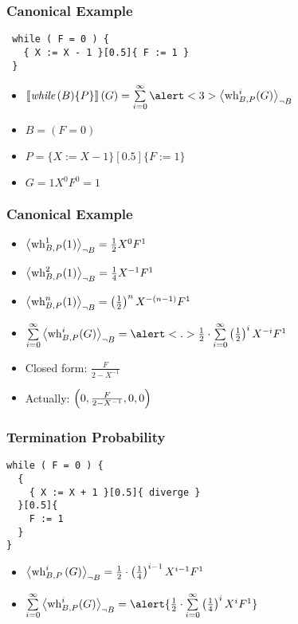 \begin{frame}[fragile]
	\frametitle{Canonical Example}
	\begin{lstlisting}
 while ( F = 0 ) {
   { X := X - 1 }[0.5]{ F := 1 }
 }
	\end{lstlisting}
	\begin{itemize}
		\itemspacing{10pt}
		\item<2-> $ \smtx{\while{B}{P}}(G) = 
			\sum\limits_{i = 0}^{\infty} \alert<3>{ \resN{\wh^i(G)} } $
		\item<4-> $ B = (F = 0) $
		\item<5-> $ P = \{ X := X - 1 \}[0.5]\{ F := 1 \} $
		\item<6-> $ G = 1 X^0 F^0 = 1 $
	\end{itemize}
\end{frame}

\begin{frame}
	\frametitle{Canonical Example}
	\begin{itemize}[<+->]
		\itemspacing{10pt}
		\item $ \left\langle \operatorname{wh}_{B, P}^1(1) \right\rangle_{\lnot B} = \frac{1}{2} X^0 F^1 $
		\item $ \left\langle \operatorname{wh}_{B, P}^2(1) \right\rangle_{\lnot B} = \frac{1}{4} X^{-1} F^1 $
		\item $\left\langle \operatorname{wh}_{B, P}^n(1) \right\rangle_{\lnot B} = \left( \frac{1}{2} \right)^n X^{-(n-1)} F^1 $
		\item $ \sum\limits_{i = 0}^{\infty} \resN{\wh^i(G)}
			= \alert<.>{\hf \cdot \sum\limits_{i = 0}^{\infty} \half^i X^{-i} F^1} $
		\item Closed form: $ \frac{F}{2 - X^{-1}} $
		\item Actually: $ \left( 0, \frac{F}{2 - X^{-1}}, 0, 0 \right) $
	\end{itemize}
\end{frame}

\begin{frame}[fragile]
\frametitle{Termination Probability}
\begin{lstlisting}
while ( F = 0 ) {
  {
    { X := X + 1 }[0.5]{ diverge }
  }[0.5]{
    F := 1
  }
}
\end{lstlisting}
\begin{itemize}[<+(1)->]
	\itemspacing{10pt}
	\item $ \left\langle \operatorname{wh}_{B, P}^i \left(G\right) \right\rangle_{\lnot B} = \frac{1}{2} \cdot \left(\frac{1}{4}\right)^{i-1} X^{i-1} F^1 $
	\item $ \sum\limits_{i = 0}^{\infty} \resN{\wh^i(G)}
	= \alert{\hf \cdot \sum\limits_{i = 0}^{\infty} \l(\frac{1}{4}\r)^i X^i F^1} $
\end{itemize}
\end{frame}

